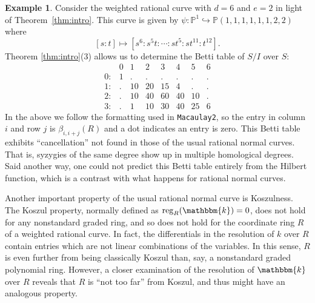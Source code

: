 \documentclass[12pt,reqno]{amsart}
\theoremstyle{definition}
\newtheorem{example}[theorem]{Example}
\theoremstyle{remark}
\DeclareMathOperator{\reg}{reg}
\newcommand{\bbk}{\mathbbm{k}}
\begin{document}
\begin{example}\label{ex:d6e2}
    Consider the weighted rational curve with $d=6$ and $e=2$ in light of Theorem~\ref{thm:intro}.  This curve is given by $\psi: \mathbb P^1 \hookrightarrow \mathbb P(1,1,1,1,1,1,2,2)$ where
    \[
    [s:t] \mapsto [s^6:s^5t:\cdots:st^5:st^{11}:t^{12}].
    \]
    Theorem \ref{thm:intro}(3)  allows us to determine the Betti table of $S/I$ over $S$:
    \[\begin{matrix}
 & 0 & 1 & 2 & 3 & 4 & 5 & 6\\
0: & 1 & . & . & . & . & . & .\\
1: & . & 10 & 20 & 15 & 4 & . & .\\
2: & . & 10 & 40 & 60 & 40 & 10 & .\\
3: & . & 1 & 10 & 30 & 40 & 25 & 6
\end{matrix}\]
In the above we follow the formatting used in \texttt{Macaulay2}, so the entry in column $i$ and row $j$ is $\beta_{i,i+j}(R)$ and a dot indicates an entry is zero. This Betti table exhibits ``cancellation'' not found in those of the usual rational normal curves.  That is, syzygies of the same degree show up in multiple homological degrees.  Said another way, one could not predict this Betti table entirely from the Hilbert function, which is a contrast with what happens for rational normal curves.
\end{example}

Another important property of the usual rational normal curve is Koszulness.  The Koszul property, normally defined as $\reg_R(\bbk) = 0$, does not hold for any nonstandard graded ring, and so does not hold for the coordinate ring $R$ of a weighted rational curve. In fact, the differentials in the resolution of $k$ over $R$ contain entries which are not linear combinations of the variables.  In this sense, $R$ is even further from being classically Koszul than, say, a nonstandard graded polynomial ring.
 However, a closer examination of the resolution of $\bbk$ over $R$ reveals that $R$ is ``not too far'' from Koszul, and thus might have an analogous property.
\end{document}
